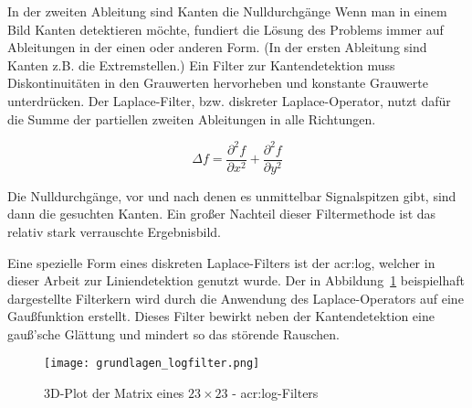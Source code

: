 In der zweiten Ableitung sind Kanten die Nulldurchgänge 
Wenn man in einem Bild Kanten detektieren möchte, fundiert die Lösung des Problems immer auf Ableitungen in der einen oder anderen Form. (In der ersten Ableitung sind Kanten z.B. die Extremstellen.) Ein Filter zur Kantendetektion muss Diskontinuitäten in den Grauwerten hervorheben und konstante Grauwerte unterdrücken. Der Laplace-Filter, bzw. diskreter Laplace-Operator, nutzt dafür die Summe der partiellen zweiten Ableitungen in alle Richtungen. \autocite{jaehneDigitaleBildverarbeitungMit2005}

\begin{equation}
\Delta f = \frac{\partial^2 f}{\partial x^2} + \frac{\partial^2 f}{\partial y^2}
\end{equation}

Die Nulldurchgänge, vor und nach denen es unmittelbar Signalspitzen gibt, sind dann die gesuchten Kanten. Ein großer Nachteil dieser Filtermethode ist das relativ stark verrauschte Ergebnisbild.

Eine spezielle Form eines diskreten Laplace-Filters ist der \gls{acr:log}, welcher in dieser Arbeit zur Liniendetektion genutzt wurde. Der in Abbildung~\ref{fig:grundlagen_logfilter} beispielhaft dargestellte Filterkern wird durch die Anwendung des Laplace-Operators auf eine Gaußfunktion erstellt. Dieses Filter bewirkt neben der Kantendetektion eine gauß'sche Glättung und mindert so das störende Rauschen.

\begin{figure}[H] %
  \centering
  \texttt{[image: grundlagen\_logfilter.png]}
  \caption{3D-Plot der Matrix eines \( 23\times23\) - \gls{acr:log}-Filters}
  \label{fig:grundlagen_logfilter}
\end{figure}  

